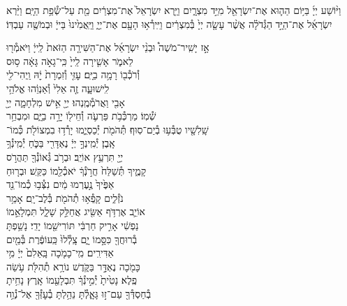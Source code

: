 \documentclass[twoside, openany, parskip=half, 11pt]{book}
\begin{document}
וַיּ֨וֹשַׁע
יְיָ֜ בַּיּ֥וֹם הַה֛וּא אֶת־יִשְׂרָאֵ֖ל מִיַּ֣ד מִצְרָ֑יִם וַיַּ֤רְא יִשְׂרָאֵל֙ אֶת־מִצְרַ֔יִם מֵ֖ת עַל־שְׂ֯פַ֥ת הַיָּֽם׃
וַיַּ֨רְא יִשְׂרָאֵ֜ל אֶת־הַיָּ֣ד הַגְּ֯דֹלָ֗ה אֲשֶׁ֨ר עָשָׂ֤ה יְיָ֙ בְּ֯מִצְרַ֔יִם וַיִּֽירְ֯א֥וּ הָעָ֖ם אֶת־יְיָ֑ וַיַּֽאֲמִ֙ינוּ֙ בַּייָ֔ וּבְמֹשֶׁ֖ה עַבְדּֽוֹ׃

אָ֣ז \hfill
יָשִֽׁיר־מֹשֶׁה֩ \hfill וּבְנֵ֨י \hfill יִשְׂרָאֵ֜ל \hfill אֶת־הַשִּׁירָ֤ה \hfill הַזֹּאת֙ \hfill לַֽייָ֔ \hfill וַיֹּאמְ֯ר֖וּ \\
לֵאמֹ֑ר \hfill אָשִׁ֤ירָה לַֽייָ֙ כִּֽי־גָאֹ֣ה גָּאָ֔ה \hfill ס֥וּס \\
וְ֯רֹכְ֯ב֖וֹ רָמָ֥ה בַיָּֽם׃ \hfill עׇזִּ֤י וְ֯זִמְרָת֙ יׇ֔הּ וַֽיְהִי־לִ֖י \\
לִֽישׁוּעָ֑ה \hfill זֶ֤ה אֵלִי֙ וְ֯אַנְוֵ֔הוּ \hfill אֱלֹהֵ֥י \\
אָבִ֖י וַאֲרֹמְ֯מֶֽנְהוּ׃ \hfill יְיָ֖ אִ֣ישׁ מִלְחָמָ֑ה יְיָ֖ \\
שְׁ֯מֽוֹ׃ \hfill מַרְכְּ֯בֹ֥ת פַּרְעֹ֛ה וְ֯חֵיל֖וֹ יָרָ֣ה בַיָּ֑ם \hfill וּמִבְחַ֥ר\\
שָֽׁלִשָׁ֖יו טֻבְּ֯ע֥וּ בְ֯יַם־סֽוּף׃ \hfill תְּ֯הֹמֹ֖ת יְ֯כַסְיֻ֑מוּ יָרְ֯ד֥וּ בִמְצוֹלֹ֖ת כְּ֯מוֹ־\\
אָֽבֶן׃ \hfill יְ֯מִֽינְךָ֣ יְיָ֔ נֶאְדָּרִ֖י בַּכֹּ֑חַ \hfill יְ֯מִֽינְ֯ךָ֥ \\
יְיָ֖ תִּרְעַ֥ץ אוֹיֵֽב׃ \hfill וּבְרֹ֥ב גְּ֯אוֹנְ֯ךָ֖ תַּהֲרֹ֣ס \\
קָמֶ֑יךָ \hfill תְּ֯שַׁלַּח֙ חֲרֹ֣נְ֯ךָ֔ יֹאכְ֯לֵ֖מוֹ כַּקַּֽשׁ׃ \hfill וּבְר֤וּחַ \\
אַפֶּ֙יךָ֙ נֶ֣עֶרְמוּ מַ֔יִם \hfill נִצְּ֯ב֥וּ כְ֯מוֹ־נֵ֖ד \\
נֹזְ֯לִ֑ים \hfill קָֽפְ֯א֥וּ תְ֯הֹמֹ֖ת בְּ֯לֶב־יָֽם׃ \hfill אָמַ֥ר \\
אוֹיֵ֛ב אֶרְדֹּ֥ף אַשִּׂ֖יג \hfill אֲחַלֵּ֣ק שָׁלָ֑ל תִּמְלָאֵ֣מוֹ \\
נַפְשִׁ֔י \hfill אָרִ֣יק חַרְבִּ֔י תּוֹרִישֵׁ֖מוֹ יָדִֽי׃ \hfill נָשַׁ֥פְתָּ \\
בְ֯רוּחֲךָ֖ כִּסָּ֣מוֹ יָ֑ם \hfill צָֽלְ֯לוּ֙ כַּֽעוֹפֶ֔רֶת בְּ֯מַ֖יִם \\
אַדִּירִֽים׃ \hfill מִֽי־כָמֹ֤כָה בָּֽאֵלִם֙ יְיָ֔ \hfill מִ֥י \\
כָּמֹ֖כָה נֶאְדָּ֣ר בַּקֹּ֑דֶשׁ \hfill נוֹרָ֥א תְ֯הִלֹּ֖ת עֹ֥שֵׂה \\
פֶֽלֶא׃ \hfill נָטִ֙יתָ֙ יְ֯מִ֣ינְ֯ךָ֔ תִּבְלָעֵ֖מוֹ אָֽרֶץ׃ \hfill נָחִ֥יתָ \\
בְ֯חַסְדְּ֯ךָ֖ עַם־ז֣וּ גָּאָ֑לְ֯תָּ \hfill נֵהַ֥לְתָּ בְ֯עׇזְּ֯ךָ֖ אֶל־נְ֯וֵ֥ה \\
\end{document}
